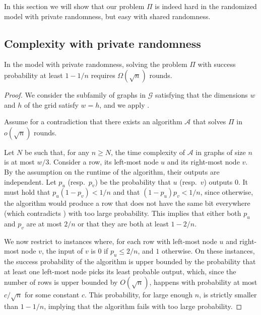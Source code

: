 \documentclass[11pt]{article}
\begin{document}
In this section we will show that our problem $\Pi$ is indeed hard in the randomized \local model with private randomness, but easy with shared randomness.

\subsection{Complexity with private randomness}

\begin{theorem}\label{th:private-rand}
	In the \local model with private randomness, solving the problem $\Pi$ with success probability at least $1 - 1/n$ requires $\Omega(\sqrt{n})$ rounds.
\end{theorem}
\begin{proof}
We consider the subfamily of graphs in $\mathcal{G}$ satisfying that the dimensions $w$ and $h$ of the grid satisfy $w = h$, and we apply . 

	Assume for a contradiction that there exists an algorithm $\mathcal{A}$ that solves $\Pi$ in $o(\sqrt{n})$ rounds. 
 
	Let $N$ be such that, for any $n\ge N$, the time complexity of $\mathcal{A}$
	in graphs of size $n$ is at most $w/3$. Consider a row, its left-most node $u$ and its right-most node $v$. By the assumption on the runtime of the algorithm, their outputs are independent. 
	Let $p_u$ (resp.\ $p_v$) be the probability that $u$ (resp.\ $v$) outputs $0$. It must hold that $p_u (1 - p_v) < 1/n$ and that $(1- p_u)p_v < 1/n$, since otherwise, the algorithm would produce a row that does not have the same bit everywhere (which contradicts ) with too large probability. This implies that either both $p_u$ and $p_v$ are at most $2/n$ or that they are both at least $1 - 2/n$.
	
	We now restrict to instances where, for each row with left-most node $u$ and right-most node $v$, the input of $v$ is $0$ if $p_u \le 2/n$, and $1$ otherwise. On these instances, the success probability of the algorithm is upper bounded by the probability that at least one left-most node picks its least probable output, which, since the number of rows is upper bounded by $O(\sqrt{n})$, happens with probability at most $c / \sqrt{n}$ for some constant $c$. This probability, for large enough $n$, is strictly smaller than $1 - 1/n$, implying that the algorithm fails with too large probability.
\end{proof}
\end{document}
